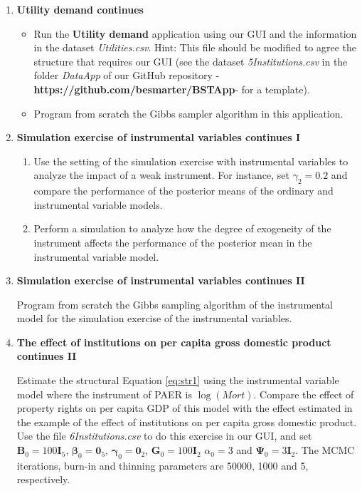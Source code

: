 \begin{enumerate}
\item \textbf{Utility demand continues}

\begin{itemize}
	\item Run the \textbf{Utility demand} application using our GUI and the information in the dataset \textit{Utilities.csv}. Hint: This file should be modified to agree the structure that requires our GUI (see the dataset \textit{5Institutions.csv} in the folder \textit{DataApp} of our GitHub repository -\textbf{https://github.com/besmarter/BSTApp}- for a template).
	\item Program from scratch the Gibbs sampler algorithm in this application.   
\end{itemize}

\item \textbf{Simulation exercise of instrumental variables continues I}

\begin{enumerate}
	\item Use the setting of the simulation exercise with instrumental variables to analyze the impact of a weak instrument. For instance, set $\gamma_2 = 0.2$ and compare the performance of the posterior means of the ordinary and instrumental variable models.
	\item Perform a simulation to analyze how the degree of exogeneity of the instrument affects the performance of the posterior mean in the instrumental variable model.
\end{enumerate}

\item \textbf{Simulation exercise of instrumental variables continues II}

Program from scratch the Gibbs sampling algorithm of the instrumental model for the simulation exercise of the instrumental variables.

\item \textbf{The effect of institutions on per capita gross domestic product continues II}

Estimate the structural Equation \ref{eq:str1} using the instrumental variable model where the instrument of PAER is $\log(\textit{Mort})$. Compare the effect of property rights on per capita GDP of this model with the effect estimated in the example of the effect of institutions on per capita gross domestic product. Use the file \textit{6Institutions.csv} to do this exercise in our GUI, and set $\bm{B}_0=100\bm{I}_5$, $\bm{\beta}_0=\bm{0}_5$, $\bm{\gamma}_0=\bm{0}_2$, $\bm{G}_0=100\bm{I}_2$ $\alpha_0=3$ and $\bm{\Psi}_0=3\bm{I}_2$. The MCMC iterations, burn-in and thinning parameters are 50000, 1000 and 5, respectively.


\end{enumerate}
